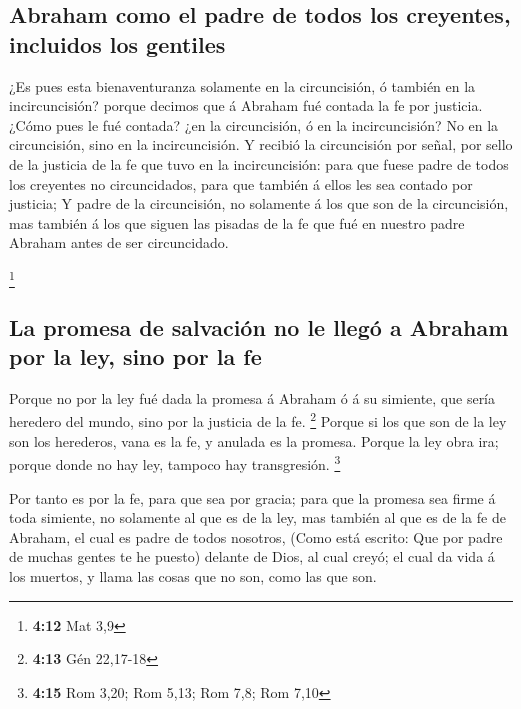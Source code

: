 \hypertarget{abraham-como-el-padre-de-todos-los-creyentes-incluidos-los-gentiles}{%
\subsection{Abraham como el padre de todos los creyentes, incluidos los
gentiles}\label{abraham-como-el-padre-de-todos-los-creyentes-incluidos-los-gentiles}}

 ¿Es pues esta bienaventuranza solamente en la circuncisión,
ó también en la incircuncisión? porque decimos que á Abraham fué contada
la fe por justicia.  ¿Cómo pues le fué contada? ¿en la
circuncisión, ó en la incircuncisión? No en la circuncisión, sino en la
incircuncisión.  Y recibió la circuncisión por señal, por
sello de la justicia de la fe que tuvo en la incircuncisión: para que
fuese padre de todos los creyentes no circuncidados, para que también á
ellos les sea contado por justicia;  Y padre de la
circuncisión, no solamente á los que son de la circuncisión, mas también
á los que siguen las pisadas de la fe que fué en nuestro padre Abraham
antes de ser circuncidado.

\footnote{\textbf{4:12} Mat 3,9}

\hypertarget{la-promesa-de-salvaciuxf3n-no-le-lleguxf3-a-abraham-por-la-ley-sino-por-la-fe}{%
\subsection{La promesa de salvación no le llegó a Abraham por la ley,
sino por la
fe}\label{la-promesa-de-salvaciuxf3n-no-le-lleguxf3-a-abraham-por-la-ley-sino-por-la-fe}}

 Porque no por la ley fué dada la promesa á Abraham ó á su
simiente, que sería heredero del mundo, sino por la justicia de la fe.
\footnote{\textbf{4:13} Gén 22,17-18}  Porque si los que
son de la ley son los herederos, vana es la fe, y anulada es la promesa.
 Porque la ley obra ira; porque donde no hay ley, tampoco
hay transgresión. \footnote{\textbf{4:15} Rom 3,20; Rom 5,13; Rom 7,8;
  Rom 7,10}

 Por tanto es por la fe, para que sea por gracia; para que
la promesa sea firme á toda simiente, no solamente al que es de la ley,
mas también al que es de la fe de Abraham, el cual es padre de todos
nosotros,  (Como está escrito: Que por padre de muchas
gentes te he puesto) delante de Dios, al cual creyó; el cual da vida á
los muertos, y llama las cosas que no son, como las que son.

